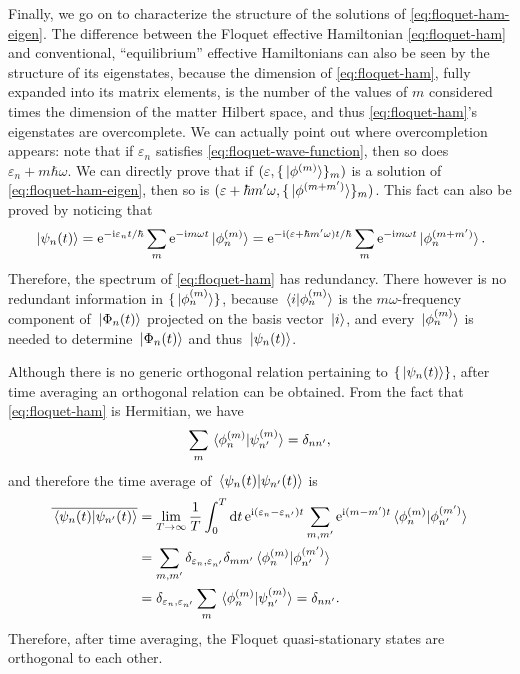 \documentclass[hyperref, a4paper]{article}
\newcommand*{\ii}{\mathrm{i}}
\newcommand*{\ee}{\mathrm{e}}
\begin{document}
Finally, we go on to characterize the structure of the solutions of  \eqref{eq:floquet-ham-eigen}.
The difference between the Floquet effective Hamiltonian \eqref{eq:floquet-ham}
and conventional, ``equilibrium'' effective Hamiltonians can also be seen  
by the structure of its eigenstates, 
because the dimension of \eqref{eq:floquet-ham}, fully expanded into its matrix elements,
is the number of the values of $m$ considered 
times the dimension of the matter Hilbert space,
and thus \eqref{eq:floquet-ham}'s eigenstates are overcomplete.
We can actually point out where overcompletion appears:
note that if $\varepsilon_n$ satisfies \eqref{eq:floquet-wave-function},
then so does $\varepsilon_n + m \hbar \omega$.
We can directly prove that if $(\varepsilon, \{\ket*{\phi^{(m)}}\}_m)$ 
is a solution of \eqref{eq:floquet-ham-eigen},
then so is $(\varepsilon + \hbar m' \omega, \{\ket*{\phi^{(m + m')}}\}_m)$.
This fact can also be proved by noticing that  
\begin{equation}
    \ket*{\psi_n(t)} = \ee^{- \ii \varepsilon_n t / \hbar} \sum_m \ee^{- \ii m \omega t} \ket*{\phi_n^{(m)}}
    = \ee^{- \ii (\varepsilon + \hbar m' \omega) t / \hbar}
    \sum_m \ee^{- \ii m \omega t} \ket*{\phi_n^{(m + m')}}.
\end{equation}
Therefore, the spectrum of \eqref{eq:floquet-ham} has redundancy. 
There however is no redundant information in $\{\ket*{\phi_n^{(m)}}\}$,
because $\braket*{i}{\phi_n^{(m)}}$ is the 
$m \omega$-frequency component of $\ket*{\Phi_n(t)}$
projected on the basis vector $\ket*{i}$,
and every $\ket*{\phi_n^{(m)}}$ is needed to determine $\ket*{\Phi_n(t)}$
and thus $\ket*{\psi_n(t)}$.

Although there is no generic orthogonal relation pertaining to $\{\ket*{\psi_n(t)}\}$,
after time averaging an orthogonal relation can be obtained.
From the fact that \eqref{eq:floquet-ham} is Hermitian, we have 
\begin{equation}
    \sum_m \braket*{\phi_n^{(m)}}{\psi_{n'}^{(m)}} = \delta_{nn'},
\end{equation}
and therefore the time average of $\braket*{\psi_n(t)}{\psi_{n'}(t)}$ is 
\begin{equation}
    \begin{aligned}
        \overline{\braket*{\psi_n(t)}{\psi_{n'}(t)}} &= 
        \lim_{T \to \infty} \frac{1}{T} \int_{0}^{T} \dd{t} 
        \ee^{\ii (\varepsilon_n - \varepsilon_{n'}) t}
        \sum_{m, m'}  \ee^{\ii (m - m') t}
        \braket*{\phi_n^{(m)}}{\phi_{n'}^{(m')}} \\
        &= \sum_{m, m'} \delta_{\varepsilon_n, \varepsilon_{n'}}
        \delta_{mm'} \braket*{\phi_n^{(m)}}{\phi_{n'}^{(m')}}  \\
        &= \delta_{\varepsilon_n, \varepsilon_{n'}} \sum_{m} \braket*{\phi_n^{(m)}}{\psi_{n'}^{(m)}}
        = \delta_{nn'}.
    \end{aligned}
    \label{eq:orthogonal}
\end{equation}
Therefore, after time averaging, the Floquet quasi-stationary states 
are orthogonal to each other.
\end{document}
